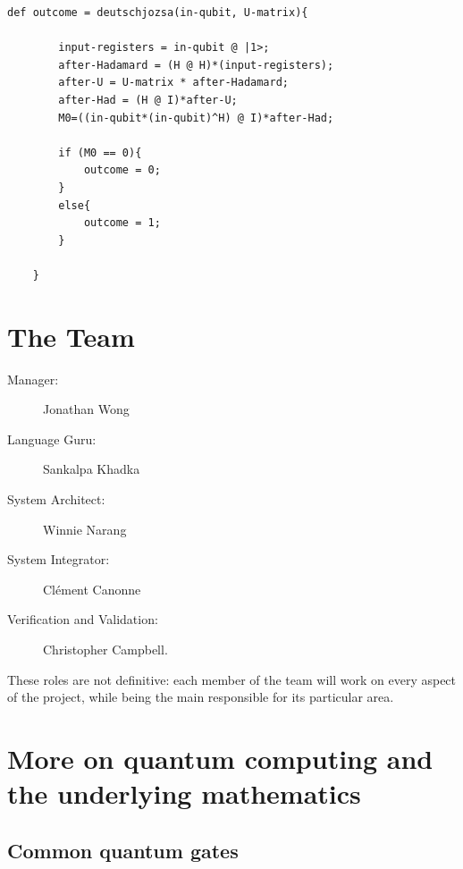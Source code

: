 \documentclass[11pt]{article}
\begin{document}
\begin{lstlisting}[frame=single]
	def outcome = deutschjozsa(in-qubit, U-matrix){
		
		input-registers = in-qubit @ |1>;
		after-Hadamard = (H @ H)*(input-registers);
		after-U = U-matrix * after-Hadamard;
		after-Had = (H @ I)*after-U;
		M0=((in-qubit*(in-qubit)^H) @ I)*after-Had;
		
		if (M0 == 0){
			outcome = 0;
		}
		else{
			outcome = 1;
		}
	
	}
\end{lstlisting}
\newpage
\section* {The Team}

\begin{description}

\item[Manager:] Jonathan Wong
\item[Language Guru:] Sankalpa Khadka
\item[System Architect:] Winnie Narang
\item[System Integrator:] Cl\'ement Canonne
\item[Verification and Validation:] Christopher Campbell.
\end{description}
These roles are not definitive: each member of the team will work on every aspect of the project, while being the main responsible for its particular area.

\newpage
\nocite{*}


\newpage
\appendix
\section{More on quantum computing and the underlying mathematics}\label{app:quantum:more}

\subsection {Common quantum gates}
\end{document}
